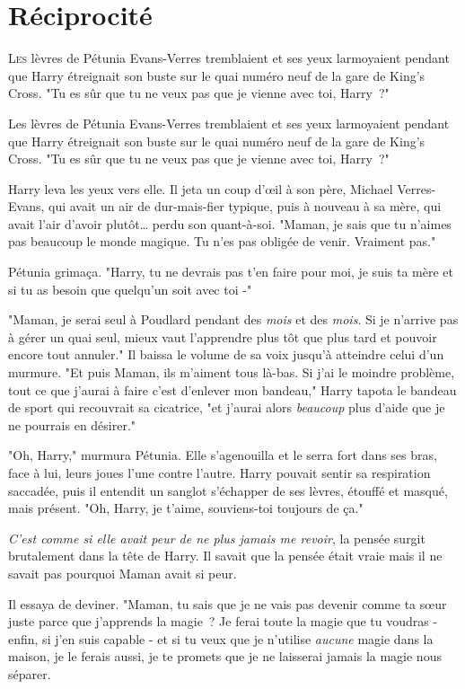 \chapter{Réciprocité}

\lettrine{L}{es} lèvres de Pétunia Evans-Verres tremblaient et ses yeux larmoyaient pendant que Harry étreignait son buste sur le quai numéro neuf de la gare de King's Cross. "Tu es sûr que tu ne veux pas que je vienne avec toi, Harry~?"

Les lèvres de Pétunia Evans-Verres tremblaient et ses yeux larmoyaient pendant que Harry étreignait son buste sur le quai numéro neuf de la gare de King's Cross. "Tu es sûr que tu ne veux pas que je vienne avec toi, Harry~?"

Harry leva les yeux vers elle. Il jeta un coup d'œil à son père, Michael Verres-Evans, qui avait un air de dur-mais-fier typique, puis à nouveau à sa mère, qui avait l'air d'avoir plutôt… perdu son quant-à-soi. "Maman, je sais que tu n'aimes pas beaucoup le monde magique. Tu n'es pas obligée de venir. Vraiment pas."

Pétunia grimaça. "Harry, tu ne devrais pas t'en faire pour moi, je suis ta mère et si tu as besoin que quelqu'un soit avec toi -"

"Maman, je serai seul à Poudlard pendant des \emph{mois} et des \emph{mois}. Si je n'arrive pas à gérer un quai seul, mieux vaut l'apprendre plus tôt que plus tard et pouvoir encore tout annuler." Il baissa le volume de sa voix jusqu'à atteindre celui d'un murmure. "Et puis Maman, ils m'aiment tous là-bas. Si j'ai le moindre problème, tout ce que j'aurai à faire c'est d'enlever mon bandeau," Harry tapota le bandeau de sport qui recouvrait sa cicatrice, "et j'aurai alors \emph{beaucoup} plus d'aide que je ne pourrais en désirer."

"Oh, Harry," murmura Pétunia. Elle s'agenouilla et le serra fort dans ses bras, face à lui, leurs joues l'une contre l'autre. Harry pouvait sentir sa respiration saccadée, puis il entendit un sanglot s'échapper de ses lèvres, étouffé et masqué, mais présent. "Oh, Harry, je t'aime, souviens-toi toujours de ça."

\emph{C'est comme si elle avait peur de ne plus jamais me revoir}, la pensée surgit brutalement dans la tête de Harry. Il savait que la pensée était vraie mais il ne savait pas pourquoi Maman avait si peur.

Il essaya de deviner. "Maman, tu sais que je ne vais pas devenir comme ta sœur juste parce que j'apprends la magie~? Je ferai toute la magie que tu voudras - enfin, si j'en suis capable - et si tu veux que je n'utilise \emph{aucune} magie dans la maison, je le ferais aussi, je te promets que je ne laisserai jamais la magie nous séparer.

